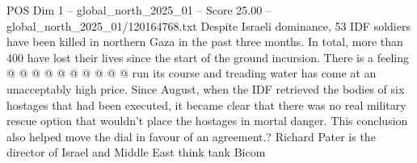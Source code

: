 \begin{textsample}{POS Dim 1 – global\_north\_2025\_01 – Score 25.00 – global\_north\_2025\_01/120164768.txt}
Despite Israeli dominance, 53 IDF soldiers have been killed in northern Gaza in the past three months.
In total, more than 400 have lost their lives since the start of the ground incursion.
There is a feeling @ @ @ @ @ @ @ @ @ @ run its course and treading water has come at an unacceptably high price.
Since August, when the IDF retrieved the bodies of six hostages that had been executed, it became clear that there was no real military rescue option that wouldn't place the hostages in mortal danger.
This conclusion also helped move the dial in favour of an agreement.?
Richard Pater is the director of Israel and Middle East think tank Bicom

\end{textsample}

